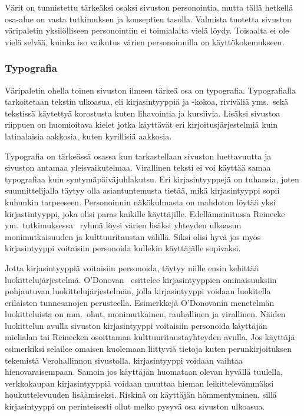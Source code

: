 \documentclass[finnish, 12pt, a4paper, elec, utf8, a-1b, online]{aaltothesis}
\begin{document}
Värit on tunnistettu tärkeäksi osaksi sivuston personointia, mutta tällä
hetkellä osa-alue on vasta tutkimuksen ja konseptien tasolla. Valmista tuotetta
sivuston väripaletin yksilölliseen personointiin ei toimialalta vielä löydy.
Toisaalta ei ole vielä selvää, kuinka iso vaikutus värien personoinnilla on
käyttökokemukseen.

\subsubsection{Typografia}\label{typography-personalization}

Väripaletin ohella toinen sivuston ilmeen tärkeä osa on typografia.
Typografialla tarkoitetaan tekstin ulkoasua, eli kirjasintyyppiä ja -kokoa,
riviväliä yms.~sekä tekstissä käytettyä korostusta kuten lihavointia ja
kursiivia. Lisäksi sivustoa riippuen on huomioitava kielet jotka käyttävät eri
kirjoitusjärjestelmiä kuin latinalaisia aakkosia, kuten kyrillisiä aakkosia.

Typografia on tärkeässä osassa kun tarkastellaan sivuston luettavuutta ja
sivuston antamaa yleisvaikutelmaa. Virallinen teksti ei voi käyttää samaa
typografiaa kuin syntymäpäiväjuhlakutsu. Eri kirjasintyyppejä on tuhansia, joten
suunnittelijalla täytyy olla asiantuntemusta tietää, mikä kirjasintyyppi sopii
kuhunkin tarpeeseen. Personoinnin näkökulmasta on mahdoton löytää yksi
kirjastintyyppi, joka olisi paras kaikille käyttäjille. Edellämainitussa
Reinecke ym.~tutkimuksessa~\cite{10.1145/2556288.2557052} ryhmä löysi värien
lisäksi yhteyden ulkoasun monimutkaisuuden ja kulttuuritaustan välillä. Siksi
olisi hyvä jos myös kirjasintyyppi voitaisiin personoida kullekin käyttäjälle
sopivaksi.

Jotta kirjasintyyppiä voitaisiin personoida, täytyy niille ensin kehittää
luokittelujärjestelmä. O'Donovan~\cite{odonovan_2015} esittelee kirjasintyyppien
ominaisuuksiin pohjautuvan luokittelujärjestelmän, jolla kirjasintyyppi voidaan
luokitella erilaisten tunnesanojen perusteella. Esimerkkejä O'Donovanin
menetelmän luokitteluista on mm.~ohut, monimutkainen, rauhallinen ja virallinen.
Näiden luokittelun avulla sivuston kirjasintyyppi voitaisiin personoida
käyttäjän mielialan tai Reinecken osoittaman kulttuuritaustayhteyden avulla. Jos
käyttäjä esimerkiksi selailee omaisen kuolemaan liittyviä tietoja kuten
perunkirjoituksen tekemistä Verohallinnon sivustolla, kirjasintyyppi voidaan
vaihtaa hienovaraisempaan. Samoin jos käyttäjän huomataan olevan hyvällä
tuulella, verkkokaupan kirjasintyyppiä voidaan muuttaa hieman leikittelevämmäksi
houkuttelevuuden lisäämiseksi. Riskinä on käyttäjän hämmentyminen, sillä
kirjasintyyppi on perinteisesti ollut melko pysyvä osa sivuston ulkoasua.
\end{document}
